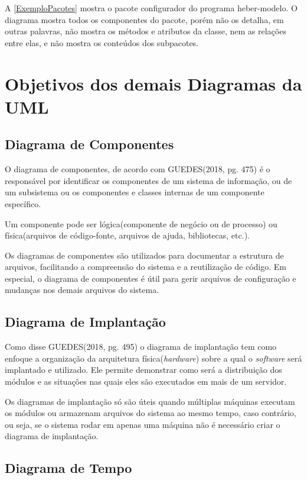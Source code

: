 \documentclass[12pt,openright,oneside,a4paper,
	chapter=TITLE,
	section=TITLE,
	english,brazil]{abntex2}
\begin{document}
A \autoref{ExemploPacotes} mostra o pacote configurador do programa heber-modelo. O diagrama mostra todos os componentes do pacote, porém não os detalha, em outras palavras, não mostra os métodos e atributos da classe, nem as relações entre elas, e não mostra os conteúdos dos subpacotes.


\chapter{Objetivos dos demais Diagramas da UML}

\section{Diagrama de Componentes}

O diagrama de componentes, de acordo com GUEDES(2018, pg. 475) é o responsável por identificar os componentes de um sistema de informação, ou de um subsistema ou os componentes e classes internas de um componente específico.

Um componente pode ser lógica(componente de negócio ou de processo) ou física(arquivos de código-fonte, arquivos de ajuda, bibliotecas, etc.).

Os diagramas de componentes são utilizados para documentar a estrutura de arquivos, facilitando a compreensão do sistema e a reutilização de código. Em especial, o diagrama de componentes é útil para gerir arquivos de configuração e mudanças nos demais arquivos do sistema.

\section{Diagrama de Implantação}

Como disse GUEDES(2018, pg. 495) o diagrama de implantação tem como enfoque a organização da arquitetura física(\textit{hardware}) sobre a qual o \textit{software} será implantado e utilizado. Ele permite demonstrar como será a distribuição dos módulos e as situações nas quais eles são executados em mais de um servidor.

Os diagramas de implantação só são úteis quando múltiplas máquinas executam os módulos ou armazenam arquivos do sistema ao mesmo tempo, caso contrário, ou seja, se o sistema rodar em apenas uma máquina não é necessário criar o diagrama de implantação.

\section{Diagrama de Tempo}
\end{document}

